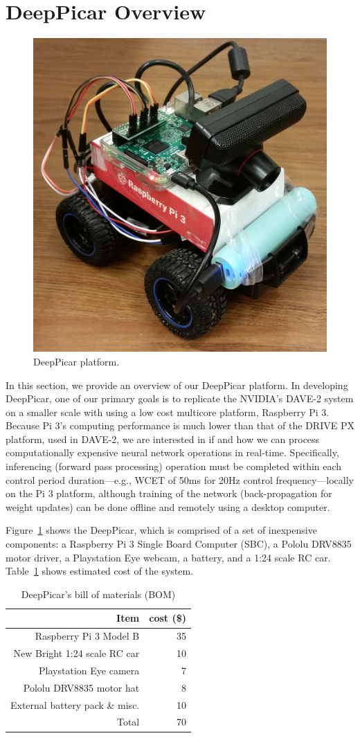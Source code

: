 \section{DeepPicar Overview}

\begin{figure}[h]
  \centering
  \includegraphics[width=.4\textwidth]{figs/DeepPicar_platform}
  \caption{DeepPicar platform.}
  \label{fig:overview}
\end{figure}

In this section, we provide an overview of our DeepPicar platform. In
developing DeepPicar, one of our primary goals is to replicate the
NVIDIA's DAVE-2 system on a smaller scale with using a low cost
multicore platform, Raspberry Pi 3. Because Pi 3's computing
performance is much lower than that of the DRIVE PX platform, used in
DAVE-2, we are interested in if and how we can process
computationally expensive neural network operations in
real-time. Specifically, inferencing (forward pass processing)
operation must be completed within each control period
duration---e.g., WCET of 50ms for 20Hz control frequency---locally on
the Pi 3 platform, although training of the network (back-propagation
for weight updates) can be done offline and remotely using a desktop
computer.

Figure~\ref{fig:overview} shows the DeepPicar, which is comprised of a
set of inexpensive components: a Raspberry Pi 3 Single Board Computer
(SBC), a Pololu DRV8835 motor driver, a Playstation Eye webcam, a
battery, and a 1:24 scale RC car. Table~\ref{tbl:carbom} shows
estimated cost of the system.

\begin{table}[h]
  \centering
  \begin{tabular}{|r|r|}
    \hline
    Item                    & cost (\$) \\
    \hline
    Raspberry Pi 3 Model B  & 35 \\
    New Bright 1:24 scale RC car       & 10 \\
    Playstation Eye camera  &  7 \\
    Pololu DRV8835 motor hat&  8 \\
    External battery pack \& misc.   & 10 \\
    \hline
    Total                   & 70 \\
    \hline
  \end{tabular}
  \caption{DeepPicar's bill of materials (BOM)}
  \label{tbl:carbom}
\end{table}

